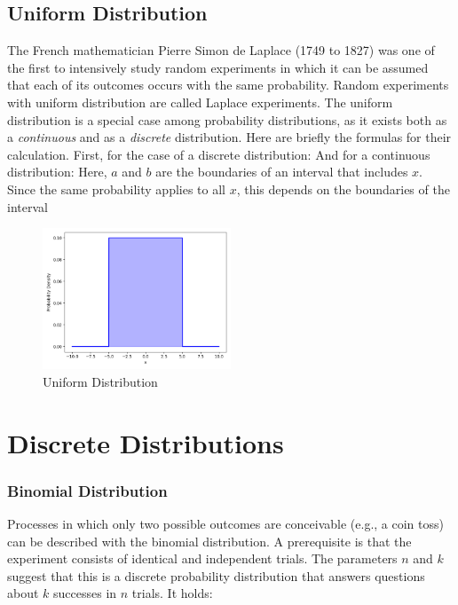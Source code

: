 \subsection{Uniform Distribution}\label{Uniform Distribution}
The French mathematician Pierre Simon de Laplace (1749 to 1827) was one of the first to intensively study random experiments in which it can be assumed that each of its outcomes occurs with the same probability. Random experiments with uniform distribution are called Laplace experiments. The uniform distribution is a special case among probability distributions, as it exists both as a \textit{continuous} and as a \textit{discrete} distribution. Here are briefly the formulas for their calculation. First, for the case of a discrete distribution:
And for a continuous distribution:
Here, $a$ and $b$ are the boundaries of an interval that includes $x$. Since the same probability applies to all $x$, this depends on the boundaries of the interval

\begin{figure}[h]
    \centering
    \includegraphics[width=0.5\textwidth]{../images/plot_uniform_distribution.png}
    \caption{Uniform Distribution}
    \label{fig:uniform_distribution}
\end{figure}

\section{Discrete Distributions}\label{Discrete Distributions}
\subsubsection{Binomial Distribution}\label{Binomial Distribution}
Processes in which only two possible outcomes are conceivable (e.g., a coin toss) can be described with the binomial distribution. A prerequisite is that the experiment consists of identical and independent trials. The parameters $n$ and $k$ suggest that this is a discrete probability distribution that answers questions about $k$ successes in $n$ trials. It holds:

